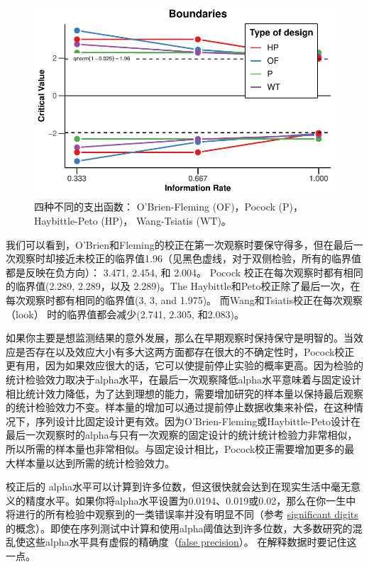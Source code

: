 \documentclass[
  letterpaper,
  DIV=11,
  numbers=noendperiod]{scrreprt}
\begin{document}
\begin{figure}

{\centering \includegraphics[width=1\textwidth,height=\textheight]{10-sequential_files/figure-pdf/fig-fourspendingfunctions-1.pdf}

}

\caption{\label{fig-fourspendingfunctions}四种不同的支出函数：
O'Brien-Fleming (OF)，Pocock (P)，Haybittle-Peto (HP)， Wang-Tsiatis
(WT)。}

\end{figure}

我们可以看到，O'Brien和Fleming的校正在第一次观察时要保守得多，但在最后一次观察时却接近未校正的临界值1.96（见黑色虚线，对于双侧检验，所有的临界值都是反映在负方向）：
3.471, 2.454, 和 2.004。 Pocock 校正在每次观察时都有相同的临界值(2.289,
2.289，以及 2.289)。The
Haybittle和Peto校正除了最后一次，在每次观察时都有相同的临界值(3, 3, and
1.975)。 而Wang和Tsiatis校正在每次观察（look） 时的临界值都会减少(2.741,
2.305, 和2.083)。

如果你主要是想监测结果的意外发展，那么在早期观察时保持保守是明智的。当效应是否存在以及效应大小有多大这两方面都存在很大的不确定性时，Pocock校正更有用，因为如果效应很大的话，它可以使提前停止实验的概率更高。因为检验的统计检验效力取决于alpha水平，在最后一次观察降低alpha水平意味着与固定设计相比统计效力降低，为了达到理想的能力，需要增加研究的样本量以保持最后观察的统计检验效力不变。样本量的增加可以通过提前停止数据收集来补偿，在这种情况下，序列设计比固定设计更有效。因为O'Brien-Fleming或Haybittle-Peto设计在最后一次观察时的alpha与只有一次观察的固定设计的统计统计检验力非常相似，所以所需的样本量也非常相似。与固定设计相比，Pocock校正需要增加更多的最大样本量以达到所需的统计检验效力。

校正后的
alpha水平可以计算到许多位数，但这很快就会达到在现实生活中毫无意义的精度水平。如果你将alpha水平设置为0.0194、0.019或0.02，那么在你一生中将进行的所有检验中观察到的一类错误率并没有明显不同（参考
\textquotesingle{}\href{https://en.wikipedia.org/wiki/Significant_figures}{significant
digits}\textquotesingle 的概念）。即使在序列测试中计算和使用alpha阈值达到许多位数，大多数研究的混乱使这些alpha水平具有虚假的精确度（\href{https://en.wikipedia.org/wiki/False_precision}{false
precision}）。 在解释数据时要记住这一点。
\end{document}
